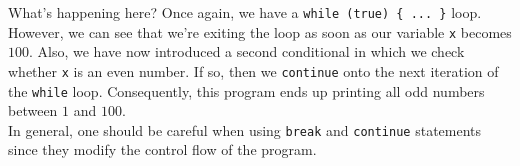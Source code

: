 What's happening here? Once again, we have a \verb!while (true) { ... }! loop. However, we can see that we're exiting the loop as soon as our variable \verb!x! becomes $100$. Also, we have now introduced a second conditional in which we check whether \verb!x! is an even number. If so, then we \verb!continue! onto the next iteration of the \verb!while! loop. Consequently, this program ends up printing all odd numbers between $1$ and $100$. \\


In general, one should be careful when using \verb!break! and \verb!continue! statements since they modify the control flow of the program. 